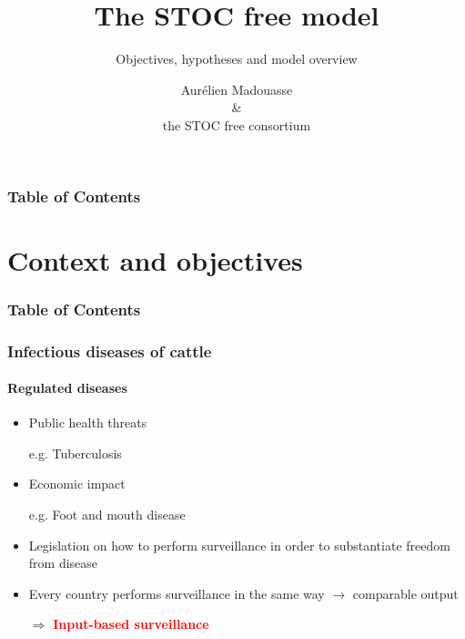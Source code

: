 \documentclass{beamer}
\title{The STOC free model}
\subtitle{Objectives, hypotheses and model overview}
\author{Aurélien Madouasse \\\& \\the STOC free consortium}
\institute{\url{https://www.stocfree.eu/}}
\begin{document}
{
  \maketitle
}

\begin{frame}
\frametitle{Table of Contents}
  \tableofcontents
\end{frame}  

\section{Context and objectives}

\begin{frame}
\frametitle{Table of Contents}
  \tableofcontents[currentsection]
\end{frame}  


\begin{frame}
\frametitle{Infectious diseases of cattle}
\framesubtitle{Regulated diseases}
\begin{itemize}
  \item{Public health threats}
  \item[]{\scriptsize e.g. Tuberculosis}
  \item{Economic impact}
  \item[]{\scriptsize e.g. Foot and mouth disease}
  \item{Legislation on how to perform surveillance in order to substantiate freedom from disease}
  \item{Every country performs surveillance in the same way $\rightarrow$ comparable output}
  \item[$\Rightarrow$]{\textcolor{red}{\textbf{Input-based surveillance}}}
 \end{itemize}
\end{frame}
\end{document}
